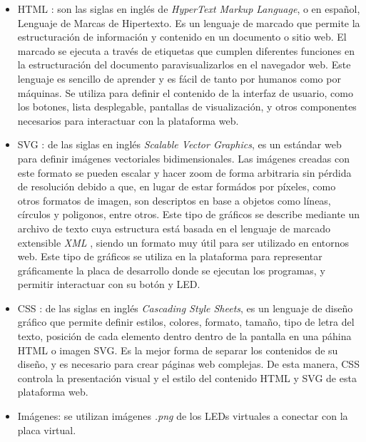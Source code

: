 \begin{itemize}
    \item HTML \citep{HTML}: son las siglas en inglés de \textit{HyperText Markup Language}, o en español, Lenguaje de Marcas de Hipertexto. Es un lenguaje de marcado que permite la estructuración de información y contenido en un documento o sitio web. El marcado se ejecuta a través de etiquetas que cumplen diferentes funciones en la estructuración del documento paravisualizarlos en el navegador web.
    Este lenguaje es sencillo de aprender y es fácil de  tanto por humanos como por máquinas. Se utiliza para definir el contenido de la interfaz de usuario, como los botones, lista desplegable, pantallas de visualización, y otros componentes necesarios para interactuar con la plataforma web.

    \item SVG \citep{SVG}: de las siglas en inglés \textit{Scalable Vector Graphics}, es un estándar web para definir imágenes vectoriales bidimensionales. Las imágenes creadas con este formato se pueden escalar y hacer zoom de forma arbitraria sin pérdida de resolución debido a que, en lugar de estar formádos por píxeles, como otros formatos de imagen, son descriptos en base a objetos como líneas, círculos y poligonos, entre otros. Este tipo de gráficos se describe mediante un archivo de texto cuya estructura está basada en el lenguaje de marcado extensible \textit{XML} \citep{XML}, siendo un formato muy útil para ser utilizado en entornos web. Este tipo de gráficos se utiliza en la plataforma para representar gráficamente la placa de desarrollo donde se ejecutan los programas, y permitir interactuar con su botón y LED.

    \item CSS \citep{CSS}: de las siglas en inglés \textit{Cascading Style Sheets}, es un lenguaje de diseño gráfico que permite definir estilos, colores, formato, tamaño, tipo de letra del texto, posición de cada elemento dentro dentro de la pantalla en una páhina HTML o imagen SVG. Es la mejor forma de separar los contenidos de su diseño, y es necesario para crear páginas web complejas. De esta manera, CSS controla la presentación visual y el estilo del contenido HTML y SVG de esta plataforma web.

    \item Imágenes: se utilizan imágenes \textit{.png} de los LEDs virtuales a conectar con la placa virtual.

\end{itemize}

